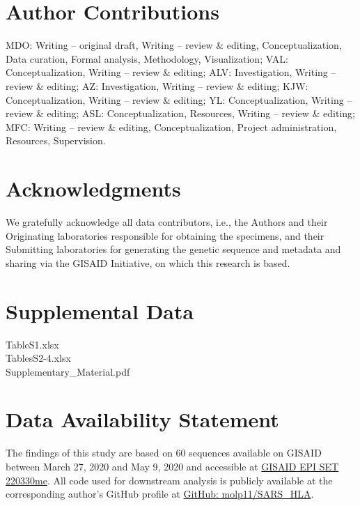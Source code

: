 \documentclass[utf8]{frontiersinFPHY_FAMS} %
\begin{document}
\section*{Author Contributions}
MDO: Writing – original draft, Writing – review \& editing, Conceptualization, Data curation, Formal analysis, Methodology, Visualization; VAL: Conceptualization, Writing – review \& editing; ALV: Investigation, Writing – review \& editing; AZ: Investigation, Writing – review \& editing; KJW: Conceptualization, Writing – review \& editing; YL: Conceptualization, Writing – review \& editing; ASL: Conceptualization, Resources, Writing – review \& editing; MFC: Writing – review \& editing, Conceptualization, Project administration, Resources, Supervision.

\section*{Acknowledgments}
We gratefully acknowledge all data contributors, i.e., the Authors and their Originating laboratories responsible for obtaining the specimens, and their Submitting laboratories for generating the genetic sequence and metadata and sharing via the GISAID Initiative, on which this research is based. 

\section*{Supplemental Data}
TableS1.xlsx\\
TablesS2-4.xlsx\\
Supplementary\_Material.pdf

\section*{Data Availability Statement}
The findings of this study are based on 60 sequences available on GISAID between March 27, 2020 and May 9, 2020 and accessible at \href{https://gisaid.org/EPI_SET_220330me}{GISAID EPI SET 220330me}. All code used for downstream analysis is publicly available at the corresponding author's GitHub profile at \href{https://github.com/molp11/SARS_HLA}{GitHub: molp11/SARS\_HLA}.




\end{document}
